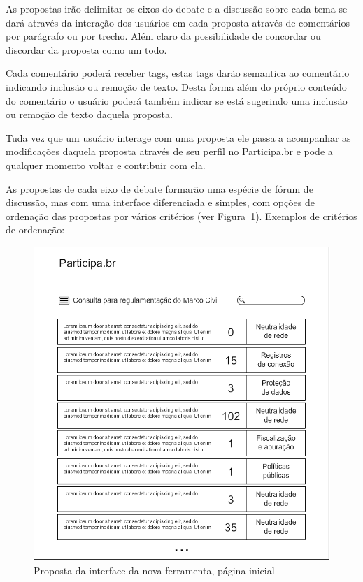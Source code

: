 \documentclass[12pt]{article}
\begin{document}

As propostas irão delimitar os eixos do debate e a discussão sobre cada tema
se dará através da interação dos usuários em cada proposta através de
comentários por parágrafo ou por trecho. Além claro da possibilidade de
concordar ou discordar da proposta como um todo.

Cada comentário poderá receber tags, estas tags darão semantica ao comentário
indicando inclusão ou remoção de texto. Desta forma além do próprio conteúdo
do comentário o usuário poderá também indicar se está sugerindo uma inclusão
ou remoção de texto daquela proposta.

Tuda vez que um usuário interage com uma proposta ele passa a acompanhar as
modificações daquela proposta através de seu perfil no Participa.br e pode a
qualquer momento voltar e contribuir com ela.

As propostas de cada eixo de debate formarão uma espécie de fórum de
discussão, mas com uma interface diferenciada e simples, com opções de
ordenação das propostas por vários critérios (ver
Figura~\ref{fig:pagina-inicial}). Exemplos de critérios de ordenação:

\begin{figure}[h]
\center
\includegraphics[scale=0.5]{01_-_pagina_inicial.png}
\caption{Proposta da interface da nova ferramenta, página inicial}
\label{fig:pagina-inicial}
\end{figure}
\end{document}
